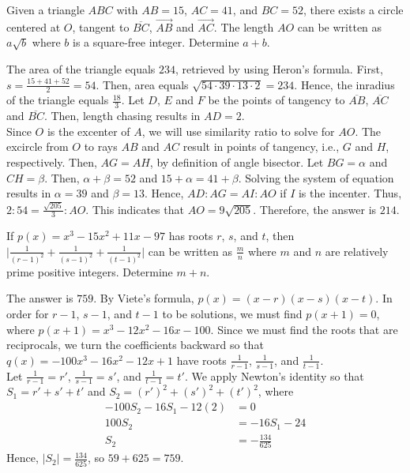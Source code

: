 \begin{problem}
Given a triangle $ABC$ with $AB=15$, $AC=41$, and $BC=52$, there exists a circle centered at $O$, tangent to $\overline{BC}$, $\overrightarrow{AB}$ and $\overrightarrow{AC}$. The length $AO$ can be written as $a\sqrt{b}$ where $b$ is a square-free integer. Determine $a+b$.
\end{problem}

\begin{solution}
The area of the triangle equals $234$, retrieved by using Heron's formula. First, $s=\frac{15+41+52}{2}=54$. Then, area equals $\sqrt{54\cdot 39 \cdot 13 \cdot 2}=234$. Hence, the inradius of the triangle equals $\frac{18}{3}$. Let $D$, $E$ and $F$ be the points of tangency to $\overline{AB}$, $\overline{AC}$ and $\overline{BC}$. Then, length chasing results in $AD=2$.\\
\bigskip
Since $O$ is the excenter of $A$, we will use similarity ratio to solve for $AO$. The excircle from $O$ to rays $AB$ and $AC$ result in points of tangency, i.e., $G$ and $H$, respectively. Then, $AG=AH$, by definition of angle bisector. Let $BG=\alpha$ and $CH=\beta$. Then, $\alpha+\beta=52$ and $15+\alpha=41+\beta$. Solving the system of equation results in $\alpha=39$ and $\beta=13$. Hence, $AD:AG=AI:AO$ if $I$ is the incenter. Thus, $2:54=\frac{\sqrt{205}}{3}:AO$. This indicates that $AO=9\sqrt{205}$. Therefore, the answer is $214$. 
\end{solution}

\begin{problem}
If $p(x)=x^3-15x^2+11x-97$ has roots $r$, $s$, and $t$, then $\lvert \frac{1}{(r-1)^2}+\frac{1}{(s-1)^2}+\frac{1}{(t-1)^2} \rvert$ can be written as $\frac{m}{n}$ where $m$ and $n$ are relatively prime positive integers. Determine $m+n$.
\end{problem}

\begin{solution}
The answer is $759$. By Viete's formula, $p(x)=(x-r)(x-s)(x-t)$. In order for $r-1$, $s-1$, and $t-1$ to be solutions, we must find $p(x+1)=0$, where $p(x+1)=x^3-12x^2-16x-100$. Since we must find the roots that are reciprocals, we turn the coefficients backward so that $q(x)=-100x^3-16x^2-12x+1$ have roots $\frac{1}{r-1}$, $\frac{1}{s-1}$, and $\frac{1}{t-1}$.\\
\bigskip
Let $\frac{1}{r-1}=r'$, $\frac{1}{s-1}=s'$, and $\frac{1}{t-1}=t'$. We apply Newton's identity so that $S_1=r'+s'+t'$ and $S_2=(r')^2+(s')^2+(t')^2$, where
\begin{align*}
-100S_2-16S_1-12(2)&=0\\
100S_2&=-16S_1-24\\
S_2&=-\frac{134}{625}
\end{align*}
Hence, $|S_2|=\frac{134}{625}$, so $59+625=759$.
\end{solution}

